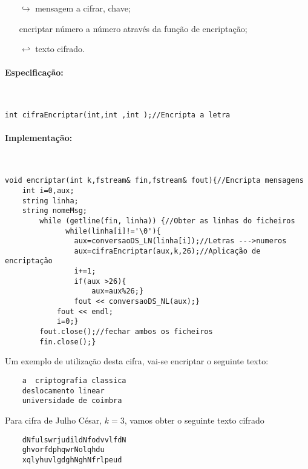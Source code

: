 \begin{itemize}
    \item[$\hookrightarrow$] mensagem a cifrar, chave;
    \item[] encriptar número a número através da função de encriptação;
    \item[$\hookleftarrow$] texto cifrado.
\end{itemize}

\paragraph{Especificação:} {\ }

\begin{lstlisting}[frame=single,mathescape=true,caption={Cifra de Deslocamento Simples---Especificação de \texttt{cifraEncriptar}},captionpos=b,label={lst:DeslocamentoSimples},basicstyle=\footnotesize]
int cifraEncriptar(int,int ,int );//Encripta a letra
\end{lstlisting}
%

\paragraph{Implementação:} {\ }

\begin{lstlisting}[frame=single,mathescape=true,caption={Encriptar},captionpos=b,label={lst:Encriptar},basicstyle=\footnotesize]
void encriptar(int k,fstream& fin,fstream& fout){//Encripta mensagens
    int i=0,aux;
    string linha;
    string nomeMsg;
        while (getline(fin, linha)) {//Obter as linhas do ficheiros
              while(linha[i]!='\0'){
                aux=conversaoDS_LN(linha[i]);//Letras --->numeros
                aux=cifraEncriptar(aux,k,26);//Aplicação de encriptação
                i+=1;
                if(aux >26){
                    aux=aux%26;}
                fout << conversaoDS_NL(aux);}
            fout << endl;
            i=0;}
        fout.close();//fechar ambos os ficheiros
        fin.close();}
\end{lstlisting}

Um exemplo de utilização desta cifra, vai-se encriptar o seguinte texto:
\begin{verbatim}
    a  criptografia classica
    deslocamento linear
    universidade de coimbra
\end{verbatim}
Para cifra de Julho César, $k=3$, vamos obter o seguinte texto cifrado
\begin{verbatim}
    dNfulswrjudildNfodvvlfdN
    ghvorfdphqwrNolqhdu
    xqlyhuvlgdghNghNfrlpeud
\end{verbatim}

